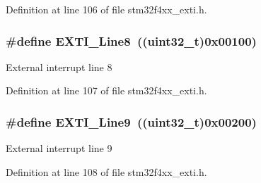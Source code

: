 Definition at line 106 of file stm32f4xx\-\_\-exti.\-h.

\hypertarget{group___e_x_t_i___lines_gacd51e087a088c3315049394cddf79e88}{
\subsubsection[{E\-X\-T\-I\-\_\-\-Line8}]{\setlength{\rightskip}{0pt plus 5cm}\#define E\-X\-T\-I\-\_\-\-Line8~((uint32\-\_\-t)0x00100)}}\label{group___e_x_t_i___lines_gacd51e087a088c3315049394cddf79e88}
External interrupt line 8 

Definition at line 107 of file stm32f4xx\-\_\-exti.\-h.

\hypertarget{group___e_x_t_i___lines_ga340ca6bb77b7a2d7747c78e7d3370360}{
\subsubsection[{E\-X\-T\-I\-\_\-\-Line9}]{\setlength{\rightskip}{0pt plus 5cm}\#define E\-X\-T\-I\-\_\-\-Line9~((uint32\-\_\-t)0x00200)}}\label{group___e_x_t_i___lines_ga340ca6bb77b7a2d7747c78e7d3370360}
External interrupt line 9 

Definition at line 108 of file stm32f4xx\-\_\-exti.\-h.

